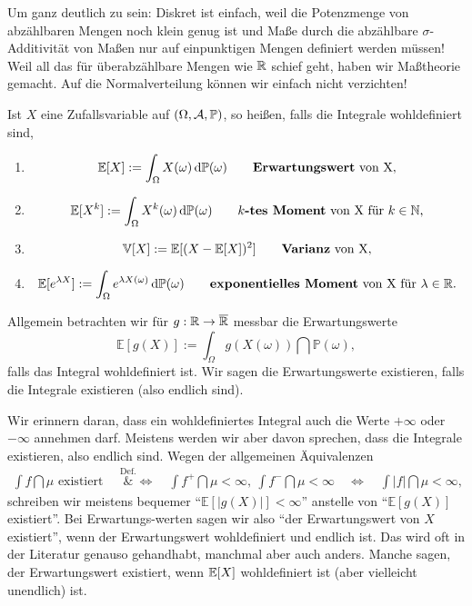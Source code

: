 Um ganz deutlich zu sein: Diskret ist einfach, weil die Potenzmenge von abz\"ahlbaren Mengen noch klein genug ist und Ma\ss e durch die abz\"ahlbare $\sigma$-Additivit\"at von Ma\ss en nur auf einpunktigen Mengen definiert werden m\"ussen! Weil all das f\"ur \"uberabz\"ahlbare Mengen wie $\mathbb{R}$ schief geht, haben wir Ma\ss theorie gemacht. Auf die Normalverteilung k\"onnen wir einfach nicht verzichten!
\begin{deff}
	Ist $X$ eine Zufallsvariable auf $(\Omega, \mathcal{A}, \mathbb{P})$, so heißen, falls die Integrale wohldefiniert sind,
	\begin{enumerate}[label=(\roman*)]
		\item \[ \mathbb{E}[X] := \int_{\Omega} X(\omega) \, \mathrm{d} \mathbb{P}(\omega) \qquad \text{\textbf{Erwartungswert} von X}, \] 
		\item \[ \mathbb{E}[X^k] := \int_{\Omega} X^k(\omega) \, \mathrm{d} \mathbb{P}(\omega) \qquad \text{\textbf{$k$-tes Moment} von X f\"ur }k\in\mathbb{N}, \]
		\item \[ \mathbb{V}[X] := \mathbb{E}[(X - \mathbb{E}[X])^2] \qquad \text{\textbf{Varianz} von X}, \]
		\item \[ \mathbb{E}[e^{\lambda X}] := \int_{\Omega} e^{\lambda X(\omega)} \, \mathrm{d} \mathbb{P}(\omega) \qquad \text{\textbf{exponentielles Moment} von X f\"ur }\lambda\in\mathbb{R}. \]
	\end{enumerate}
	Allgemein betrachten wir f\"ur $g:\mathbb{R}\to\overline {\mathbb{R}}$ messbar die Erwartungswerte 
		\[ \mathbb{E}[g(X)] := \int_{\Omega} g(X(\omega)) \dint \mathbb{P}(\omega), \]
	falls das Integral wohldefiniert ist. Wir sagen die Erwartungswerte existieren, falls die Integrale existieren (also endlich sind).
\end{deff}
Wir erinnern daran, dass ein wohldefiniertes Integral auch die Werte $+\infty$ oder $-\infty$ annehmen darf. Meistens werden wir aber davon sprechen, dass die Integrale existieren, also endlich sind. Wegen der allgemeinen \"Aquivalenzen 
\begin{align*}
	\int f \dint \mu \text{ existiert } \quad\overset{\text{Def.}}&{\Leftrightarrow}\quad \int f^+ \dint \mu < \infty, \: \int f^- \dint \mu < \infty
	\quad{\Leftrightarrow}\quad \int |f| \dint \mu < \infty,
\end{align*}
schreiben wir meistens bequemer \enquote{$\mathbb{E}[|g(X)|] < \infty$} anstelle von \enquote{$\mathbb{E}[g(X)]$ existiert}. Bei Erwartungs-werten sagen wir also \enquote{der Erwartungswert von $X$ existiert}, wenn der Erwartungswert wohldefiniert und endlich ist. Das wird oft in der Literatur genauso gehandhabt, manchmal aber auch anders. Manche sagen, der Erwartungswert existiert, wenn $\mathbb{E}[X]$ wohldefiniert ist (aber vielleicht unendlich) ist.

